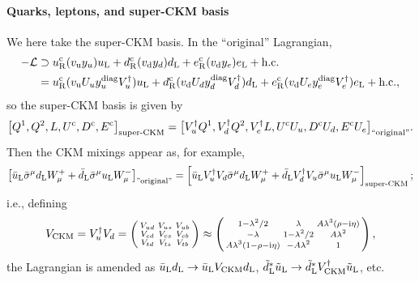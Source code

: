 \documentclass[CheatSheet]{subfiles}
\begin{document}
\paragraph{Quarks, leptons, and super-CKM basis}
We here take the super-CKM basis.
In the ``original'' Lagrangian,
\begin{align}
 -\mathcal L&\supset
   u_{\mathrm{R}}^{\mathrm{c}} (v_{\mathrm{u}} y_{u})u_{\mathrm{L}}
  +d_{\mathrm{R}}^{\mathrm{c}} (v_{\mathrm{d}} y_{d})d_{\mathrm{L}}
  +e_{\mathrm{R}}^{\mathrm{c}} (v_{\mathrm{d}} y_{e})e_{\mathrm{L}} + \text{h.c.}
 \\
&=
   u_{\mathrm{R}}^{\mathrm{c}} (v_{\mathrm{u}} U_u y_{u}^{\mathrm{diag}} V_u^\dagger)u_{\mathrm{L}}
  +d_{\mathrm{R}}^{\mathrm{c}} (v_{\mathrm{d}} U_d y_{d}^{\mathrm{diag}} V_d^\dagger)d_{\mathrm{L}}
  +e_{\mathrm{R}}^{\mathrm{c}} (v_{\mathrm{d}} U_e y_{e}^{\mathrm{diag}} V_e^\dagger)e_{\mathrm{L}} + \text{h.c.},
\end{align}
so the super-CKM basis is given by
\begin{equation}
 \bigl[
 Q^1, Q^2, L, U^{\mathrm{c}}, D^{\mathrm{c}}, E^{\mathrm{c}}
\bigr]_{\text{super-CKM}} =
 \bigl[
 V_u^\dagger Q^1, V_d^\dagger Q^2, V_e^\dagger L, U^{\mathrm{c}} U_u, D^{\mathrm{c}} U_d, E^{\mathrm{c}} U_e
\bigr]_{\text{``original''}}.
\end{equation}
Then the CKM mixings appear as, for example,
\begin{equation}
 \left[\bar u_{\mathrm{L}}\bar\sigma^\mu d_{\mathrm{L}} W^+_\mu + \bar d_{\mathrm{L}}\bar\sigma^\mu u_{\mathrm{L}} W^-_\mu\right]_{\text{''original''}}
=
 \left[\bar u_{\mathrm{L}} V_u^\dagger V_d \bar\sigma^\mu d_{\mathrm{L}} W^+_\mu + \bar d_{\mathrm{L}} V_d^\dagger V_u\bar\sigma^\mu u_{\mathrm{L}} W^-_\mu\right]_{\text{super-CKM}};
\end{equation}
i.e., defining
\begin{equation}
 V_{\mathrm{CKM}} = V_u^\dagger V_d = \left(
\begin{smallmatrix}
 V_{ud} & V_{us} & V_{ub}\\
 V_{cd} & V_{cs} & V_{cb}\\
 V_{td} & V_{ts} & V_{tb}
\end{smallmatrix}
\right)
\approx\left(
\begin{smallmatrix}
 1-\lambda^2/2 & \lambda       & A\lambda^3(\rho-\mathrm{i} \eta)\\
 -\lambda      & 1-\lambda^2/2 & A\lambda^2\\
 A\lambda^3(1-\rho-\mathrm{i}\eta) & -A\lambda^2 & 1
\end{smallmatrix}\right),
\end{equation}
the Lagrangian is amended as $\bar u_{\mathrm{L}}d_{\mathrm{L}}\to \bar u_{\mathrm{L}} V_{\mathrm{CKM}}d_{\mathrm{L}}$, $\tilde d_{\mathrm{L}}^*\tilde u_{\mathrm{L}}\to \tilde d_{\mathrm{L}}^* V^\dagger_{\mathrm{CKM}}\tilde u_{\mathrm{L}}$, etc.
\end{document}
